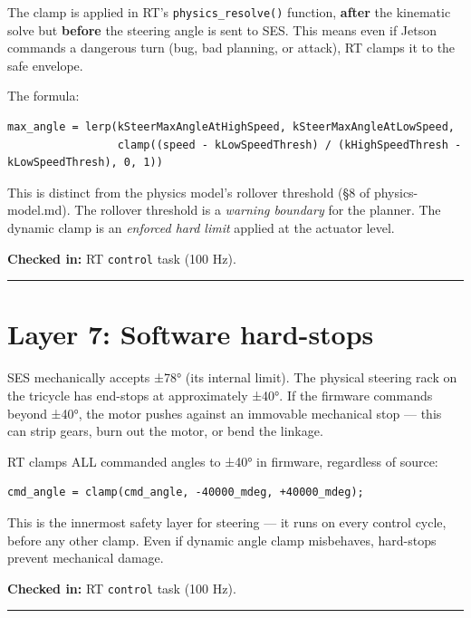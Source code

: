 \documentclass[12pt,a4paper,oneside]{report}
\begin{document}
The clamp is applied in RT's \texttt{physics\_resolve()} function,
\textbf{after} the kinematic solve but \textbf{before} the steering angle is
sent to SES. This means even if Jetson commands a dangerous turn (bug, bad
planning, or attack), RT clamps it to the safe envelope.

The formula:

\begin{verbatim}
max_angle = lerp(kSteerMaxAngleAtHighSpeed, kSteerMaxAngleAtLowSpeed,
                 clamp((speed - kLowSpeedThresh) / (kHighSpeedThresh - kLowSpeedThresh), 0, 1))
\end{verbatim}

This is distinct from the physics model's rollover threshold (§8 of
physics-model.md). The rollover threshold is a \emph{warning boundary} for the
planner. The dynamic clamp is an \emph{enforced hard limit} applied at the
actuator level.

\textbf{Checked in:} RT \texttt{control} task (100 Hz).

\begin{center}\rule{0.5\linewidth}{0.5pt}\end{center}

\section{Layer 7: Software hard-stops}\label{layer-7-software-hard-stops}

SES mechanically accepts ±78° (its internal limit). The physical steering rack
on the tricycle has end-stops at approximately ±40°. If the firmware commands
beyond ±40°, the motor pushes against an immovable mechanical stop --- this can
strip gears, burn out the motor, or bend the linkage.

RT clamps ALL commanded angles to ±40° in firmware, regardless of source:

\begin{verbatim}
cmd_angle = clamp(cmd_angle, -40000_mdeg, +40000_mdeg);
\end{verbatim}

This is the innermost safety layer for steering --- it runs on every control
cycle, before any other clamp. Even if dynamic angle clamp misbehaves,
hard-stops prevent mechanical damage.

\textbf{Checked in:} RT \texttt{control} task (100 Hz).

\begin{center}\rule{0.5\linewidth}{0.5pt}\end{center}
\end{document}
